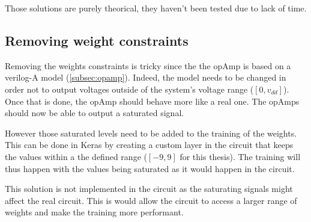 Those solutions are purely theorical, they haven't been tested due to lack of time.

\subsection{Removing weight constraints}\label{subsec:noCons}

Removing the weights constraints is tricky since the the \ac{opAmp} is based on a verilog-A model (\cref{subsec:opamp}). Indeed, the model needs to be changed in order not to output voltages outside of the system's voltage range ($[0,v_{dd}]$). Once that is done, the \ac{opAmp} should behave more like a real one. The \acp{opAmp} should now be able to output a saturated signal.

However those saturated levels need to be added to the training of the weights. This can be done in Keras by creating a custom layer in the circuit that keeps the values within a the defined range ($[-9,9]$ for this thesis). The training will thus happen with the values being saturated as it would happen in the circuit.

This solution is not implemented in the circuit as the saturating signals might affect the real circuit. This is would allow the circuit to access a larger range of weights and make the training more performant.
